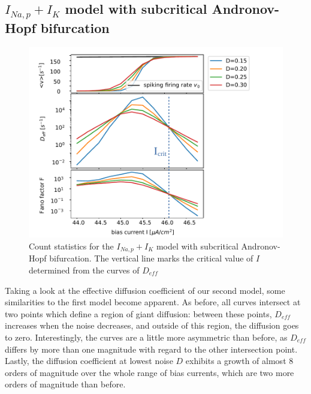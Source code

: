 \documentclass[12pt,a4paper]{article}
\begin{document}
\subsection{$I_{Na,p}+I_K$ model with subcritical Andronov-Hopf bifurcation}

\begin{figure}[H]
	\centering
	\includegraphics[scale=1]{allfastanhopf2.pdf}\caption{Count statistics for the $I_{Na,p}+I_K$ model with subcritical Andronov-Hopf bifurcation. The vertical line marks the critical value of $I$ determined from the curves of $D_{eff}$}
	\label{allanhopf}
\end{figure}
Taking a look at the effective diffusion coefficient of our second model, some similarities to the first model become apparent. As before, all curves intersect at two points which define a region of giant diffusion: between these points, $D_{eff}$ increases when the noise decreases, and outside of this region, the diffusion goes to zero. Interestingly, the curves are a little more asymmetric than before, as $D_{eff}$ differs by more than one magnitude with regard to the other intersection point. Lastly, the diffusion coefficient at lowest noise $D$ exhibits a growth of almost 8 orders of magnitude over the whole range of bias currents, which are two more orders of magnitude than before. 
\end{document}
